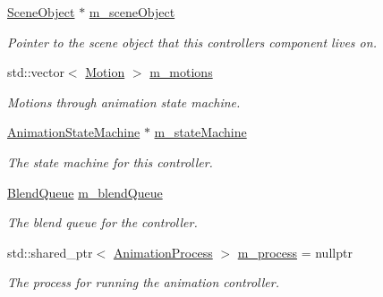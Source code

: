 \begin{Indent}
\begin{DoxyCompactItemize}
\mbox{\label{classrev_1_1_animation_controller_ae14f295bb48a1974fe4793ae0d7e1b99}} 
\mbox{\hyperlink{classrev_1_1_scene_object}{Scene\+Object}} $\ast$ \mbox{\hyperlink{classrev_1_1_animation_controller_ae14f295bb48a1974fe4793ae0d7e1b99}{m\+\_\+scene\+Object}}
\begin{DoxyCompactList}\small\item\em Pointer to the scene object that this controller\textquotesingle{}s component lives on. \end{DoxyCompactList}\item 
\mbox{\label{classrev_1_1_animation_controller_a514ddefcb5735968a0aa5cf3d9018346}} 
std\+::vector$<$ \mbox{\hyperlink{classrev_1_1_motion}{Motion}} $>$ \mbox{\hyperlink{classrev_1_1_animation_controller_a514ddefcb5735968a0aa5cf3d9018346}{m\+\_\+motions}}
\begin{DoxyCompactList}\small\item\em Motions through animation state machine. \end{DoxyCompactList}\item 
\mbox{\label{classrev_1_1_animation_controller_aaaa26f2e750e2e66c36c13bd8bb643d5}} 
\mbox{\hyperlink{classrev_1_1_animation_state_machine}{Animation\+State\+Machine}} $\ast$ \mbox{\hyperlink{classrev_1_1_animation_controller_aaaa26f2e750e2e66c36c13bd8bb643d5}{m\+\_\+state\+Machine}}
\begin{DoxyCompactList}\small\item\em The state machine for this controller. \end{DoxyCompactList}\item 
\mbox{\label{classrev_1_1_animation_controller_a1cf6713a4a355d5926105903c47fafd0}} 
\mbox{\hyperlink{classrev_1_1_blend_queue}{Blend\+Queue}} \mbox{\hyperlink{classrev_1_1_animation_controller_a1cf6713a4a355d5926105903c47fafd0}{m\+\_\+blend\+Queue}}
\begin{DoxyCompactList}\small\item\em The blend queue for the controller. \end{DoxyCompactList}\item 
\mbox{\label{classrev_1_1_animation_controller_a0ecd225cd7c600b98fb9d42a98bf24f0}} 
std\+::shared\+\_\+ptr$<$ \mbox{\hyperlink{classrev_1_1_animation_process}{Animation\+Process}} $>$ \mbox{\hyperlink{classrev_1_1_animation_controller_a0ecd225cd7c600b98fb9d42a98bf24f0}{m\+\_\+process}} = nullptr
\begin{DoxyCompactList}\small\item\em The process for running the animation controller. \end{DoxyCompactList}\end{DoxyCompactItemize}
\end{Indent}
